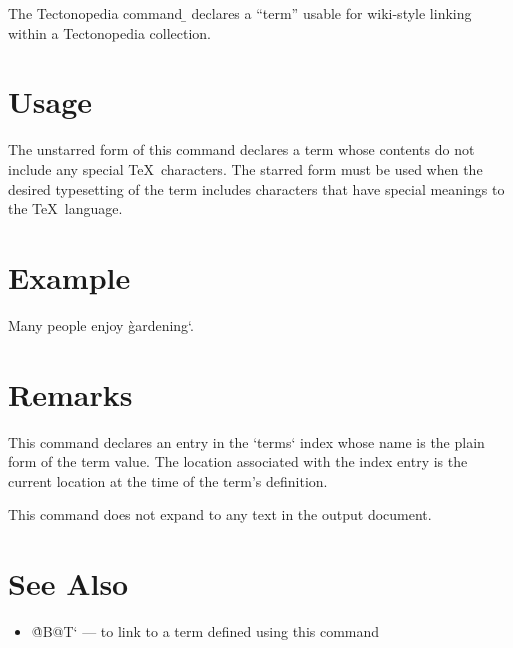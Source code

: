 
The Tectonopedia command \b{\string\DeclareTerm} declares a “term” usable for
wiki-style linking within a Tectonopedia collection.

\section*{Usage}

\begin{texdisp}
\end{texdisp}

The unstarred form of this command declares a term whose contents do not include
any special \TeX\ characters. The starred form must be used when the desired
typesetting of the term includes characters that have special meanings to the
\TeX\ language.

\section*{Example}

\begin{texdisp}

Many people enjoy \`gardening`.
\end{texdisp}

\section*{Remarks}

This command declares an entry in the \tex`terms` index whose name is the plain
form of the term value. The location associated with the index entry is the
current location at the time of the term’s definition.

This command does not expand to any text in the output document.

\section*{See Also}

\begin{itemize}
\item \`@B@T` — to link to a term defined using this command
\end{itemize}


\tduxEmit %

